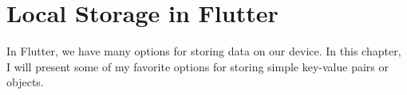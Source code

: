\chapter{Local Storage in Flutter}

In Flutter, we have many options for storing data on our device.
In this chapter, I will present some of my favorite options for storing 
simple key-value pairs or objects.





